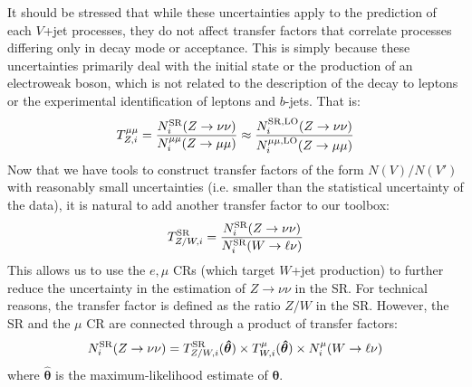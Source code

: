 It should be stressed that while these uncertainties apply to the prediction of each $V$+jet processes, they do not affect transfer factors that correlate processes differing only in decay mode or acceptance.
This is simply because these uncertainties primarily deal with the initial state or the production of an electroweak boson, which is not related to the description of the decay to leptons or the experimental identification of leptons and $b$-jets.
That is:
\begin{equation}
    {T}^{\mu\mu}_{Z,i} = \frac{N^\mathrm{SR}_i(Z\rightarrow\nu\nu)}{N_i^{\mu\mu}(Z\rightarrow\mu\mu)} \approx \frac{N^\mathrm{SR,LO}_i(Z\rightarrow\nu\nu)}{N_i^{\mu\mu,\mathrm{LO}}(Z\rightarrow\mu\mu)}
\end{equation}
Now that we have tools to construct transfer factors of the form $N(V)/N(V')$ with reasonably small uncertainties (i.e. smaller than the statistical uncertainty of the data), it is natural to add another transfer factor to our toolbox:
\begin{equation}
    {T}^{\mathrm{SR}}_{Z/W,i} = \frac{N^\mathrm{SR}_i(Z\rightarrow\nu\nu)}{N_i^\mathrm{SR}(W\rightarrow\ell\nu)}
\end{equation}
This allows us to use the $e,\mu$ CRs (which target $W$+jet production) to further reduce the uncertainty in the estimation of $Z\rightarrow\nu\nu$ in the SR.
For technical reasons, the transfer factor is defined as the ratio $Z/W$ in the SR.
However, the SR and the $\mu$ CR are connected through a product of transfer factors:
\begin{equation}
    N^\mathrm{SR}_i(Z\rightarrow\nu\nu) = {T}^{\mathrm{SR}}_{Z/W,i}(\bm{\hat\theta}) \times {T}^{\mu}_{W,i}(\bm{\hat\theta}) \times N^\mu_i(W\rightarrow\ell\nu)
\end{equation}
where $\bm{\hat\theta}$ is the maximum-likelihood estimate of $\bm\theta$.

